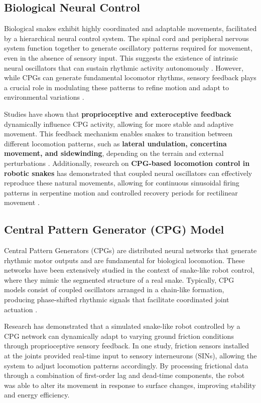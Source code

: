\documentclass[12pt,a4paper]{report}
\begin{document}
\subsection{Biological Neural Control}

Biological snakes exhibit highly coordinated and adaptable movements, facilitated by a hierarchical neural control system. The spinal cord and peripheral nervous system function together to generate oscillatory patterns required for movement, even in the absence of sensory input. This suggests the existence of intrinsic neural oscillators that can sustain rhythmic activity autonomously \textcite{Inoue2007}. However, while CPGs can generate fundamental locomotor rhythms, sensory feedback plays a crucial role in modulating these patterns to refine motion and adapt to environmental variations \textcite{MARDER2001R986}.

Studies have shown that \textbf{proprioceptive and exteroceptive feedback} dynamically influence CPG activity, allowing for more stable and adaptive movement. This feedback mechanism enables snakes to transition between different locomotion patterns, such as \textbf{lateral undulation, concertina movement, and sidewinding}, depending on the terrain and external perturbations \textcite{Inoue2007}. Additionally, research on \textbf{CPG-based locomotion control in robotic snakes} has demonstrated that coupled neural oscillators can effectively reproduce these natural movements, allowing for continuous sinusoidal firing patterns in serpentine motion and controlled recovery periods for rectilinear movement  \textcite{manzoor-2019}.


\subsection{Central Pattern Generator (CPG) Model}
Central Pattern Generators (CPGs) are distributed neural networks that generate rhythmic motor outputs and are fundamental for biological locomotion. These networks have been extensively studied in the context of snake-like robot control, where they mimic the segmented structure of a real snake. Typically, CPG models consist of coupled oscillators arranged in a chain-like formation, producing phase-shifted rhythmic signals that facilitate coordinated joint actuation \textcite{wang2020cpg}.

Research has demonstrated that a simulated snake-like robot controlled by a CPG network can dynamically adapt to varying ground friction conditions through proprioceptive sensory feedback. In one study, friction sensors installed at the joints provided real-time input to sensory interneurons (SINs), allowing the system to adjust locomotion patterns accordingly. By processing frictional data through a combination of first-order lag and dead-time components, the robot was able to alter its movement in response to surface changes, improving stability and energy efficiency\textcite{Inoue2007}. 
\end{document}
